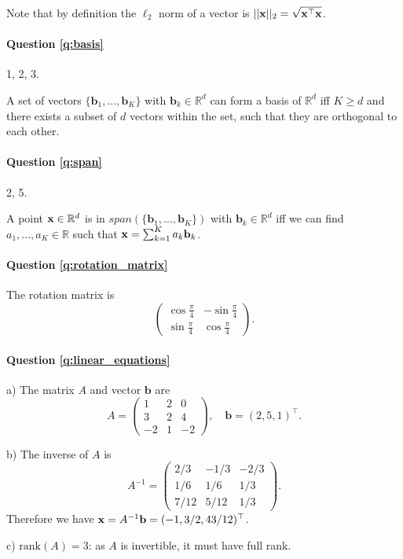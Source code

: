 Note that by definition the $\ell_2$ norm of a vector is $|| \mathbf{x} ||_2 = \sqrt{\mathbf{x}^\top \mathbf{x}}$.

\paragraph{Question \ref{q:basis}} 1, 2, 3. 

A set of vectors $\{\mathbf{b}_1, ..., \mathbf{b}_K \}$ with $\mathbf{b}_k \in \mathbb{R}^d$ can form a basis of $\mathbb{R}^d$ iff $K \geq d$ and there exists a subset of $d$ vectors within the set, such that they are orthogonal to each other.

\paragraph{Question \ref{q:span}} 2, 5. 

A point $\mathbf{x} \in \mathbb{R}^d$ is in $span(\{\mathbf{b}_1, ..., \mathbf{b}_K \})$ with $\mathbf{b}_k \in \mathbb{R}^d$ iff we can find $a_1, ..., a_K \in \mathbb{R}$ such that $\mathbf{x} = \sum_{k=1}^K a_k \mathbf{b}_k$.

\paragraph{Question \ref{q:rotation_matrix}} The rotation matrix is 
\begin{equation*}
    \begin{pmatrix}
    \cos{\frac{\pi}{4}} & -\sin{\frac{\pi}{4}} \\
    \sin{\frac{\pi}{4}} & \cos{\frac{\pi}{4}}
    \end{pmatrix}.
\end{equation*}

\paragraph{Question \ref{q:linear_equations}}

a) The matrix $A$ and vector $\mathbf{b}$ are
\begin{equation*}
A = \begin{pmatrix}
1 & 2 & 0 \\
3 & 2 & 4 \\
-2 & 1 & -2
\end{pmatrix}, \quad \mathbf{b} = (2, 5, 1)^\top.
\end{equation*}

b) The inverse of $A$ is 
\begin{equation*}
A^{-1} = \begin{pmatrix}
2/3 & -1/3 & -2/3 \\
1/6 & 1/6 & 1/3 \\
7/12 & 5/12 & 1/3
\end{pmatrix}.
\end{equation*}
Therefore we have $\mathbf{x} = A^{-1} \mathbf{b} = (-1, 3/2, 43/12)^\top$.

c) $\text{rank}(A) = 3$: as $A$ is invertible, it must have full rank.